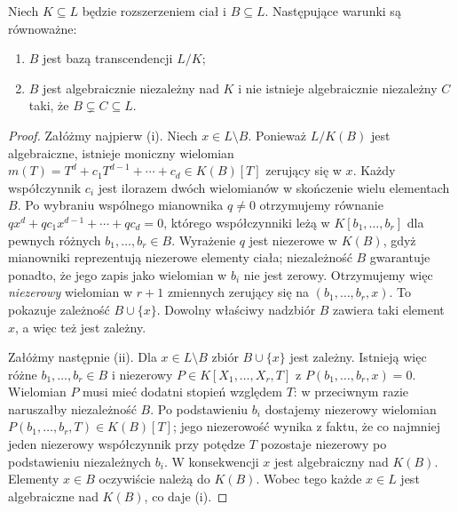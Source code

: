 \begin{lemat}
\label{aa:lem:transcendence-maximal}
Niech $K\subseteq L$ będzie rozszerzeniem ciał i $B\subseteq L$.
Następujące warunki są równoważne:
\begin{enumerate}[label=(\roman*)]
 \item $B$ jest bazą transcendencji $L/K$;
 \item $B$ jest algebraicznie niezależny nad $K$ i nie istnieje
       algebraicznie niezależny $C$ taki, że $B\subsetneq C\subseteq L$.
\end{enumerate}
\end{lemat}
\begin{proof}
Załóżmy najpierw (i). Niech $x\in L\setminus B$.
Ponieważ $L/K(B)$ jest algebraiczne, istnieje moniczny
wielomian $m(T)=T^d+c_1T^{d-1}+\cdots+c_d\in K(B)[T]$
zerujący się w $x$. Każdy współczynnik $c_i$ jest ilorazem
dwóch wielomianów w skończenie wielu elementach $B$.
Po wybraniu wspólnego mianownika $q\ne0$ otrzymujemy
równanie $q x^d+q c_1x^{d-1}+\cdots+q c_d=0$,
którego współczynniki leżą w $K[b_1,\ldots,b_r]$
dla pewnych różnych $b_1,\ldots,b_r\in B$.
Wyrażenie $q$ jest niezerowe w $K(B)$, gdyż mianowniki
reprezentują niezerowe elementy ciała; niezależność $B$
gwarantuje ponadto, że jego zapis jako wielomian w $b_i$
nie jest zerowy. Otrzymujemy więc \emph{niezerowy} wielomian
w $r+1$ zmiennych zerujący się na $(b_1,\ldots,b_r,x)$.
To pokazuje zależność $B\cup\{x\}$. Dowolny właściwy
nadzbiór $B$ zawiera taki element $x$, a więc też jest zależny.

Załóżmy następnie (ii). Dla $x\in L\setminus B$ zbiór
$B\cup\{x\}$ jest zależny. Istnieją więc różne
$b_1,\ldots,b_r\in B$ i niezerowy
$P\in K[X_1,\ldots,X_r,T]$ z
$P(b_1,\ldots,b_r,x)=0$.
Wielomian $P$ musi mieć dodatni stopień względem $T$:
w przeciwnym razie naruszałby niezależność $B$.
Po podstawieniu $b_i$ dostajemy niezerowy wielomian
$P(b_1,\ldots,b_r,T)\in K(B)[T]$;
jego niezerowość wynika z faktu, że co najmniej jeden
niezerowy współczynnik przy potędze $T$ pozostaje niezerowy
po podstawieniu niezależnych $b_i$.
W konsekwencji $x$ jest algebraiczny nad $K(B)$.
Elementy $x\in B$ oczywiście należą do $K(B)$.
Wobec tego każde $x\in L$ jest algebraiczne nad $K(B)$,
co daje (i).
\end{proof}

